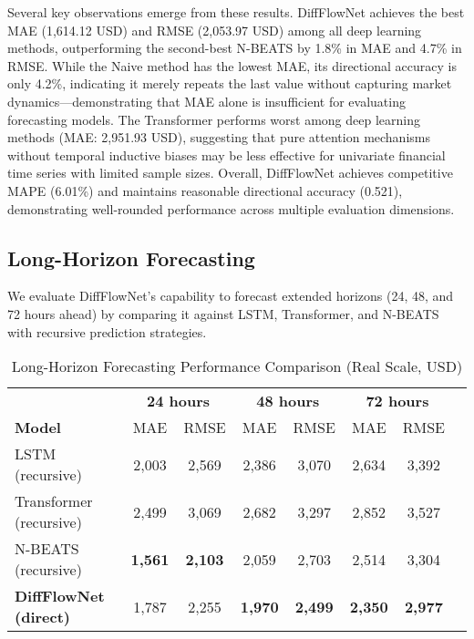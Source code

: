 \documentclass[11pt,a4paper]{article}
\begin{document}
Several key observations emerge from these results. DiffFlowNet achieves the best MAE (1,614.12 USD) and RMSE (2,053.97 USD) among all deep learning methods, outperforming the second-best N-BEATS by 1.8\% in MAE and 4.7\% in RMSE. While the Naive method has the lowest MAE, its directional accuracy is only 4.2\%, indicating it merely repeats the last value without capturing market dynamics—demonstrating that MAE alone is insufficient for evaluating forecasting models. The Transformer performs worst among deep learning methods (MAE: 2,951.93 USD), suggesting that pure attention mechanisms without temporal inductive biases may be less effective for univariate financial time series with limited sample sizes. Overall, DiffFlowNet achieves competitive MAPE (6.01\%) and maintains reasonable directional accuracy (0.521), demonstrating well-rounded performance across multiple evaluation dimensions.

\subsection{Long-Horizon Forecasting}

We evaluate DiffFlowNet's capability to forecast extended horizons (24, 48, and 72 hours ahead) by comparing it against LSTM, Transformer, and N-BEATS with recursive prediction strategies.

\begin{table}[htbp]
\centering
\caption{Long-Horizon Forecasting Performance Comparison (Real Scale, USD)}
\label{tab:long_horizon}
\begin{tabular}{lccccccc}
\toprule
& \multicolumn{2}{c}{\textbf{24 hours}} & \multicolumn{2}{c}{\textbf{48 hours}} & \multicolumn{2}{c}{\textbf{72 hours}} \\
\cmidrule(lr){2-3} \cmidrule(lr){4-5} \cmidrule(lr){6-7}
\textbf{Model} & MAE & RMSE & MAE & RMSE & MAE & RMSE \\
\midrule
LSTM (recursive) & 2,003 & 2,569 & 2,386 & 3,070 & 2,634 & 3,392 \\
Transformer (recursive) & 2,499 & 3,069 & 2,682 & 3,297 & 2,852 & 3,527 \\
N-BEATS (recursive) & \textbf{1,561} & \textbf{2,103} & 2,059 & 2,703 & 2,514 & 3,304 \\
\midrule
\textbf{DiffFlowNet (direct)} & 1,787 & 2,255 & \textbf{1,970} & \textbf{2,499} & \textbf{2,350} & \textbf{2,977} \\
\bottomrule
\end{tabular}
\end{table}
\end{document}
